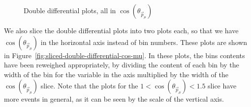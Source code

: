 \documentclass{article}
\begin{document}
\begin{figure}
    \caption{Double differential plots, all in $\cos(\theta_{\vec{p}_{\mu}})$}
    \label{fig:double-differential-cos-mu}
\end{figure}

We also slice the double differential plots into two plots each, so that we have $\cos(\theta_{\vec{p}_{\mu}})$ in the horizontal axis instead of bin numbers. These plots are shown in Figure~\ref{fig:sliced-double-differential-cos-mu}. In these plots, the bins contents have been reweighed appropriately, by dividing the content of each bin by the width of the bin for the variable in the axis multiplied by the width of the $\cos(\theta_{\vec{p}_{\mu}})$ slice. Note that the plots for the $1 < \cos(\theta_{\vec{p}_{\mu}}) < 1.5$ slice have more events in general, as it can be seen by the scale of the vertical axis. 
\end{document}
